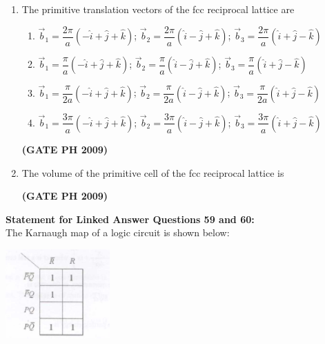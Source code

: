 \documentclass[14pt, a4paper]{extarticle}
\begin{document}
\begin{enumerate}[label=\textbf{Q. \arabic*}, start=57]

\item The primitive translation vectors of the fcc reciprocal lattice are
\begin{enumerate}
\item $\vec{b}_1 = \dfrac{2\pi}{a}(-\hat{i}+\hat{j}+\hat{k})$; $\vec{b}_2 = \dfrac{2\pi}{a}(\hat{i}-\hat{j}+\hat{k})$; $\vec{b}_3 = \dfrac{2\pi}{a}(\hat{i}+\hat{j}-\hat{k})$
\item $\vec{b}_1 = \dfrac{\pi}{a}(-\hat{i}+\hat{j}+\hat{k})$; $\vec{b}_2 = \dfrac{\pi}{a}(\hat{i}-\hat{j}+\hat{k})$; $\vec{b}_3 = \dfrac{\pi}{a}(\hat{i}+\hat{j}-\hat{k})$
\item $\vec{b}_1 = \dfrac{\pi}{2a}(-\hat{i}+\hat{j}+\hat{k})$; $\vec{b}_2 = \dfrac{\pi}{2a}(\hat{i}-\hat{j}+\hat{k})$; $\vec{b}_3 = \dfrac{\pi}{2a}(\hat{i}+\hat{j}-\hat{k})$
\item $\vec{b}_1 = \dfrac{3\pi}{a}(-\hat{i}+\hat{j}+\hat{k})$; $\vec{b}_2 = \dfrac{3\pi}{a}(\hat{i}-\hat{j}+\hat{k})$; $\vec{b}_3 = \dfrac{3\pi}{a}(\hat{i}+\hat{j}-\hat{k})$
\end{enumerate}
\hfill \textbf{(GATE PH 2009)}

\item The volume of the primitive cell of the fcc reciprocal lattice is
\begin{enumerate}
\end{enumerate}
\hfill \textbf{(GATE PH 2009)}

\end{enumerate}

\vspace{1.5em}
\noindent
\textbf{Statement for Linked Answer Questions 59 and 60:} \\
The Karnaugh map of a logic circuit is shown below:
    \begin{center}
        \includegraphics[width=0.3\textwidth]{figs/Q59-60fig.png}
        \label{fig:q59-60}
    \end{center}
\end{document}
